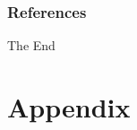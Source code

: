 \documentclass{beamer}
\begin{document}
\begin{frame}
\frametitle{References}
\justifying




\end{frame}


\begin{frame}
\Huge{\centerline{The End}}
\end{frame}


\section{Appendix}%
\end{document}
